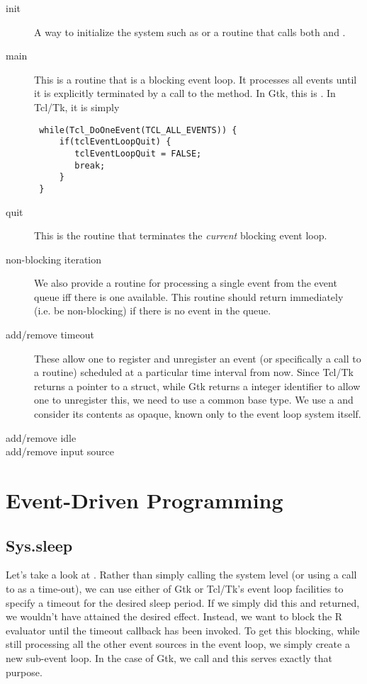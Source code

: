 \documentclass{article}
\begin{document}
\begin{description}
\item[init] A way to initialize the system such as 
  or a routine that calls both  and
  .

\item[main] This is a routine that is a blocking event loop.  It
  processes all events until it is explicitly terminated by a call to
  the  method.  In Gtk, this is .
In Tcl/Tk, it is simply
\begin{verbatim}
 while(Tcl_DoOneEvent(TCL_ALL_EVENTS)) {
     if(tclEventLoopQuit) {
        tclEventLoopQuit = FALSE;
        break;
     }
 }
\end{verbatim}
\item[quit]
This is the routine that terminates the
\textit{current} blocking event loop.

\item[non-blocking iteration]
We also provide a routine for processing
a single event from the event queue
iff there is one available.
This routine should return immediately
(i.e. be non-blocking) if there is no
event in the queue.

\item[add/remove timeout] These allow one to register and unregister
  an event (or specifically a call to a routine) scheduled at a
  particular time interval from now.
  Since Tcl/Tk returns a pointer to a struct,
  while Gtk returns a integer identifier
  to allow one to unregister this, we need
  to use a common base type.
  We use a  and consider its contents
  as opaque, known only to the event loop system
  itself.

\item[add/remove idle]

\item[add/remove input source]

\end{description}



\section{Event-Driven Programming}

\subsection{Sys.sleep}
Let's take a look at .  Rather than simply
calling the system level  (or using a call to
 as a time-out), we can use either of Gtk or Tcl/Tk's
event loop facilities to specify a timeout for the desired sleep
period. If we simply did this and returned, we wouldn't have attained
the desired effect. Instead, we want to block the R evaluator until
the timeout callback has been invoked.  To get this blocking, while
still processing all the other event sources in the event loop, we
simply create a new sub-event loop.  In the case of Gtk, we call
 and this serves exactly that purpose.
\end{document}
